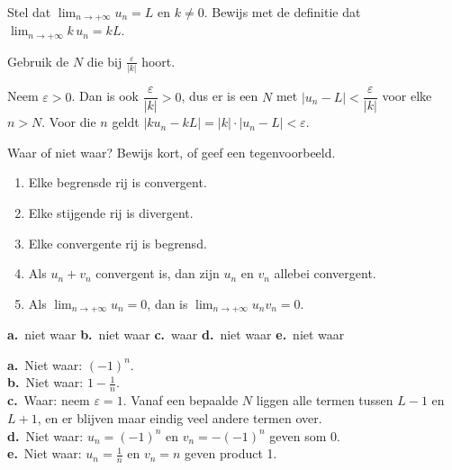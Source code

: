\begin{oefeningen}
\begin{oefening}[3]
Stel dat $\displaystyle\lim_{n\to+\infty} u_n = L$ en $k \neq 0$. Bewijs met de definitie dat $\displaystyle\lim_{n\to+\infty} k\,u_n = kL$.
\begin{solution}
Gebruik de $N$ die bij $\tfrac{\varepsilon}{|k|}$ hoort.
\end{solution}
\begin{fullsolution}
Neem $\varepsilon>0$. Dan is ook $\dfrac{\varepsilon}{|k|}>0$, dus er is een $N$ met $|u_n-L|<\dfrac{\varepsilon}{|k|}$ voor elke $n>N$. Voor die $n$ geldt $|ku_n-kL|=|k|\cdot|u_n-L|<\varepsilon$.
\end{fullsolution}
\end{oefening}

\begin{oefening}[3]
Waar of niet waar? Bewijs kort, of geef een tegenvoorbeeld.
\begin{enumerate}
  \item Elke begrensde rij is convergent.
  \item Elke stijgende rij is divergent.
  \item Elke convergente rij is begrensd.
  \item Als $u_n + v_n$ convergent is, dan zijn $u_n$ en $v_n$ allebei convergent.
  \item Als $\displaystyle\lim_{n\to+\infty} u_n = 0$, dan is $\displaystyle\lim_{n\to+\infty} u_n v_n = 0$.
\end{enumerate}
\begin{solution}
\textbf{a.}~niet waar \quad \textbf{b.}~niet waar \quad \textbf{c.}~waar \quad \textbf{d.}~niet waar \quad \textbf{e.}~niet waar
\end{solution}
\begin{fullsolution}
\textbf{a.}~Niet waar: $(-1)^n$.\\
\textbf{b.}~Niet waar: $1-\tfrac1n$.\\
\textbf{c.}~Waar: neem $\varepsilon=1$. Vanaf een bepaalde $N$ liggen alle termen tussen $L-1$ en $L+1$, en er blijven maar eindig veel andere termen over.\\
\textbf{d.}~Niet waar: $u_n=(-1)^n$ en $v_n=-(-1)^n$ geven som 0.\\
\textbf{e.}~Niet waar: $u_n=\tfrac1n$ en $v_n=n$ geven product 1.
\end{fullsolution}
\end{oefening}


\end{oefeningen}
